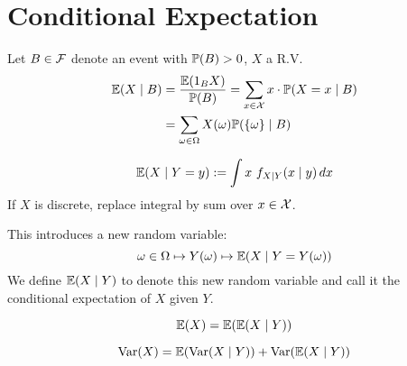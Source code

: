 \section{Conditional Expectation}
\begin{ddefinition*}
  Let \(B \in \F\) denote an event with \(\P(B) > 0\), \(X\) a R.V.
  \begin{align*}
    \E(X \mid B) &= \frac{\E(\I_B X)}{\P(B)} = \sum_{x \in \DX} x \cdot \P(X = x \mid B) \\
    &= \sum_{\omega \in \O} X(\omega) \P(\{\omega\} \mid B)
  \end{align*}
\end{ddefinition*}

\begin{cdefinition*} \vspace{-5pt}
  \[\E(X \mid Y = y) := \int x \ f_{X \mid Y}(x \mid y) \,dx\]
  If \(X\) is discrete, replace integral by sum over \(x \in \DX\).
\end{cdefinition*}

This introduces a new random variable:
\[\omega \in \O \mapsto Y(\omega) \mapsto \E(X \mid Y = Y(\omega))\]
We define \(\E(X \mid Y)\) to denote this new random variable and call it the conditional expectation of \(X\) given \(Y\).




\begin{theorem*} \vspace{-5pt}
  \[\E(X) = \E(\E(X \mid Y))\]
\end{theorem*}

\begin{theorem*} \vspace{-5pt}
  \[\Var(X) = \E(\Var(X \mid Y)) + \Var(\E(X \mid Y))\]
\end{theorem*}

